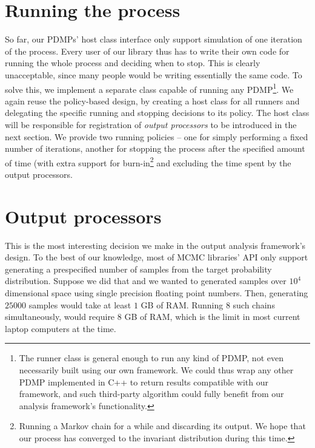 \documentclass[report.tex]{subfiles}
\begin{document}
\section{Running the process}

So far, our PDMPs' host class interface only support simulation of one iteration
of the process.
Every user of our library thus has to write their own code for running the whole process
and deciding when to stop. This is clearly unacceptable, since many people would be
writing essentially the same code.
To solve this, we implement a separate class capable of running any PDMP\footnote{
  The runner class is general enough to run any kind of PDMP, not even necessarily built
  using our own framework. We could thus wrap any other PDMP implemented in C++ to return
  results compatible with our framework, and such third-party algorithm could fully benefit
  from our analysis framework's functionality.
}. We again reuse the policy-based design, by creating a host class for all runners
and delegating the specific running and stopping decisions to its policy.
The host class will be responsible for registration of \textit{output processors} to be
introduced in the next section. We provide two running policies -- one for simply
performing a fixed number of iterations, another for stopping the process after
the specified amount of time (with extra support for
burn-in\footnote{Running a Markov chain
for a while and discarding its output. We hope that our process has converged to the invariant distribution
during this time.
} and excluding the time spent by the output processors.


\section{Output processors}
This is the most interesting decision we make in the output analysis framework's design.
To the best of our knowledge, most of MCMC libraries' API only support generating
a prespecified number of samples from the target probability distribution.
Suppose we did that and we wanted to generated samples over $10^{4}$ dimensional space
using single precision floating point numbers.
Then, generating $25000$ samples would take at least $1$ GB of RAM. Running 8 such
chains simultaneously, would require $8$ GB of RAM, which is the limit in most
current laptop computers at the time.
\end{document}
